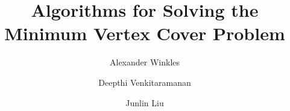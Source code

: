 \documentclass[acmlarge]{acmart}
\begin{document}
\title{Algorithms for Solving the Minimum Vertex Cover Problem} 

\author{Alexander Winkles}
\author{Deepthi Venkitaramanan} 
\author{Junlin Liu}
\authorsaddresses{}

\maketitle

\renewcommand{\shortauthors}{CSE6140 Project Report}


\end{document}
